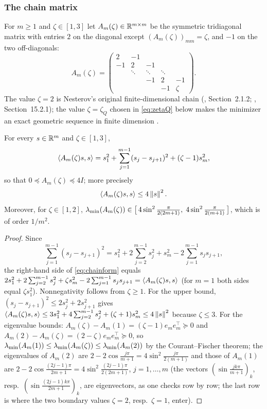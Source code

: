 \subsubsection{The chain matrix}

For $m\ge1$ and $\zeta\in[1,3]$ let $A_m(\zeta)\in\mathbb{R}^{m\times m}$ be the symmetric tridiagonal matrix with entries $2$ on the diagonal except $(A_m(\zeta))_{mm}=\zeta$, and $-1$ on the two off-diagonals:
\begin{equation}
\label{eq:chainmatrix}
A_m(\zeta)=\begin{pmatrix} 2&-1&&&\\ -1&2&-1&&\\ &\ddots&\ddots&\ddots&\\ &&-1&2&-1\\ &&&-1&\zeta\end{pmatrix}.
\end{equation}
The value $\zeta=2$ is Nesterov's original finite-dimensional chain (\cite{nesterov2018lectures}, Section~2.1.2; \cite{bach2024learning}, Section~15.2.1); the value $\zeta=\zeta_Q$ chosen in \eqref{eq:zetaQ} below makes the minimizer an exact geometric sequence in finite dimension \cite{lan2018optimal}.

\begin{lemma}
\label{lem:chain}
For every $s\in\mathbb{R}^m$ and $\zeta\in[1,3]$,
\begin{equation}
\label{eq:chainform}
\left\langle A_m(\zeta)s, s \right\rangle=s_1^2+\sum_{j=1}^{m-1}(s_j-s_{j+1})^2+(\zeta-1)s_m^2 ,
\end{equation}
so that $0\preceq A_m(\zeta)\preceq 4I$; more precisely
\begin{equation}
\label{ineq:chain-smooth}
\left\langle A_m(\zeta)s, s \right\rangle\le 4\left\|s\right\|^2 .
\end{equation}
Moreover, for $\zeta\in[1,2]$, $\lambda_{\min}(A_m(\zeta))\in\big[\,4\sin^2\tfrac{\pi}{2(2m+1)},\;4\sin^2\tfrac{\pi}{2(m+1)}\,\big]$, which is of order $1/m^2$.
\end{lemma}

\begin{proof}
Since
\[
\sum_{j=1}^{m-1}(s_j-s_{j+1})^2=s_1^2+2\sum_{j=2}^{m-1}s_j^2+s_m^2-2\sum_{j=1}^{m-1}s_js_{j+1},
\]
the right-hand side of \eqref{eq:chainform} equals $2s_1^2+2\sum_{j=2}^{m-1}s_j^2+\zeta s_m^2-2\sum_{j=1}^{m-1}s_js_{j+1}=\left\langle A_m(\zeta)s, s \right\rangle$ (for $m=1$ both sides equal $\zeta s_1^2$). Nonnegativity follows from $\zeta\ge1$. For the upper bound, $(s_j-s_{j+1})^2\le 2s_j^2+2s_{j+1}^2$ gives $\left\langle A_m(\zeta)s, s \right\rangle\le 3s_1^2+4\sum_{j=2}^{m-1}s_j^2+(\zeta+1)s_m^2\le 4\left\|s\right\|^2$ because $\zeta\le3$. For the eigenvalue bounds: $A_m(\zeta)-A_m(1)=(\zeta-1)e_me_m^\top\succeq0$ and $A_m(2)-A_m(\zeta)=(2-\zeta)e_me_m^\top\succeq0$, so $\lambda_{\min}(A_m(1))\le\lambda_{\min}(A_m(\zeta))\le\lambda_{\min}(A_m(2))$ by the Courant--Fischer theorem; the eigenvalues of $A_m(2)$ are $2-2\cos\frac{j\pi}{m+1}=4\sin^2\frac{j\pi}{2(m+1)}$ and those of $A_m(1)$ are $2-2\cos\frac{(2j-1)\pi}{2m+1}=4\sin^2\frac{(2j-1)\pi}{2(2m+1)}$, $j=1,\dots,m$ (the vectors $(\sin\frac{jk\pi}{m+1})_k$, resp.\ $(\sin\frac{(2j-1)k\pi}{2m+1})_k$, are eigenvectors, as one checks row by row; the last row is where the two boundary values $\zeta=2$, resp.\ $\zeta=1$, enter).
\end{proof}

